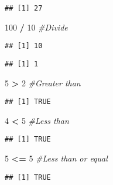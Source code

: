 \documentclass[]{article}
\newenvironment{Shaded}{\begin{snugshade}}{\end{snugshade}}
\newcommand{\CommentTok}[1]{\textcolor[rgb]{0.56,0.35,0.01}{\textit{#1}}}
\newcommand{\DecValTok}[1]{\textcolor[rgb]{0.00,0.00,0.81}{#1}}
\newcommand{\OperatorTok}[1]{\textcolor[rgb]{0.81,0.36,0.00}{\textbf{#1}}}
\newcommand{\StringTok}[1]{\textcolor[rgb]{0.31,0.60,0.02}{#1}}
\begin{document}
\begin{verbatim}
## [1] 27
\end{verbatim}

\begin{Shaded}
\begin{Highlighting}[]
\DecValTok{100} \OperatorTok{/}\StringTok{ }\DecValTok{10} \CommentTok{#Divide}
\end{Highlighting}
\end{Shaded}

\begin{verbatim}
## [1] 10
\end{verbatim}

\begin{Shaded}
\end{Shaded}

\begin{verbatim}
## [1] 1
\end{verbatim}

\begin{Shaded}
\begin{Highlighting}[]
\DecValTok{5} \OperatorTok{>}\StringTok{ }\DecValTok{2} \CommentTok{#Greater than}
\end{Highlighting}
\end{Shaded}

\begin{verbatim}
## [1] TRUE
\end{verbatim}

\begin{Shaded}
\begin{Highlighting}[]
\DecValTok{4} \OperatorTok{<}\StringTok{ }\DecValTok{5} \CommentTok{#Less than}
\end{Highlighting}
\end{Shaded}

\begin{verbatim}
## [1] TRUE
\end{verbatim}

\begin{Shaded}
\begin{Highlighting}[]
\DecValTok{5} \OperatorTok{<=}\StringTok{ }\DecValTok{5} \CommentTok{#Less than or equal}
\end{Highlighting}
\end{Shaded}

\begin{verbatim}
## [1] TRUE
\end{verbatim}
\end{document}
